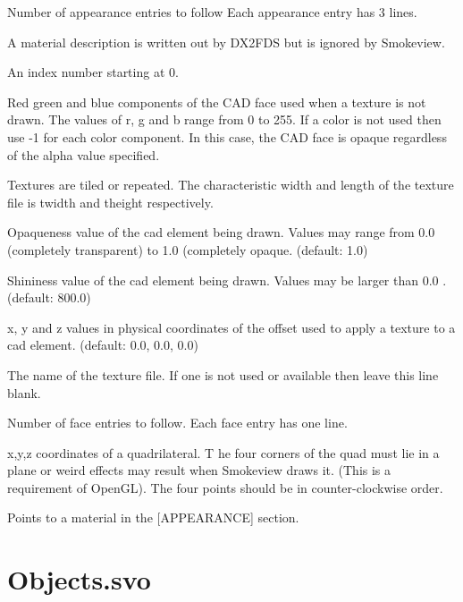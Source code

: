 \documentclass[11pt,twoside]{book}
\newcommand{\parma}{.75}
\newcommand{\parmb}{.5}
\newcommand{\parmc}{0.25}
\newcommand{\blist}{
\begin{list}
{}{
\setlength{\leftmargin}{\parma in}
\setlength{\labelwidth}{\parmb in}
\setlength{\labelsep}{\parmc in}
\setlength{\listparindent}{0.3in}
\setlength{\topsep}{.3in}
\setlength{\parsep}{.0in}
}}
\newcommand{\elist}{\end{list}}
\newcommand{\hitem}[1]{\item[{\bf #1} \hfill]}
\begin{document}
\blist

\hitem{nappearances} Number of appearance entries to follow
Each appearance entry has 3 lines.
\hitem{string} A material description is written out by DX2FDS but is ignored by Smokeview.
\hitem{index} An index number starting at 0.
\hitem{r, g, b} Red green and blue components of the CAD face used when a texture is not drawn.
The values of r, g and b range from 0 to 255.  If a color is not used
then use -1 for each color component.  In this case, the CAD face is opaque regardless of the alpha value specified.
\hitem{twidth, theight} Textures are tiled or repeated.
The characteristic width and length of the
texture file is twidth and theight respectively.
\hitem{alpha}Opaqueness value of the cad element being drawn.
Values may range from 0.0 (completely transparent)
to 1.0 (completely opaque.  (default: 1.0)
\hitem{shininess} Shininess value of the cad element being drawn.
Values may be larger than 0.0 .  (default: 800.0)
\hitem{tx0, ty0, tz0} x, y and z values in physical coordinates of the offset used to apply a
texture to a cad element. (default: 0.0, 0.0, 0.0)
\hitem{tfile} The name of the texture file.  If one is not used or
available then leave this line blank.
\hitem{nfaces} Number of face entries to follow.  Each face entry has one line.
\hitem{x1/y1/z1/.../x4/y4/z4}x,y,z coordinates of a quadrilateral.  T
he four corners of the quad
must lie in a plane or weird effects may result when Smokeview draws it.
(This is a requirement
of OpenGL).  The four points should be in counter-clockwise order.
\hitem{index} Points to a material in the [APPEARANCE] section.
\elist

\section{Objects.svo}
\label{section:objects}

\end{document}
